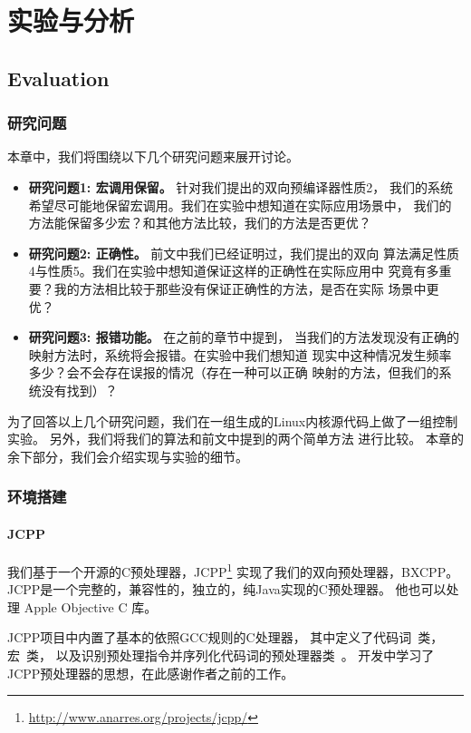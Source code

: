 \chapter{实验与分析}
\section{Evaluation}
\label{sec:evaluation}
\subsection{研究问题}
本章中，我们将围绕以下几个研究问题来展开讨论。
\begin{itemize}
\item {\bf 研究问题1: 宏调用保留。} 针对我们提出的双向预编译器性质2，
  我们的系统希望尽可能地保留宏调用。我们在实验中想知道在实际应用场景中，
  我们的方法能保留多少宏？和其他方法比较，我们的方法是否更优？
\item {\bf 研究问题2: 正确性。} 前文中我们已经证明过，我们提出的双向
  算法满足性质4与性质5。我们在实验中想知道保证这样的正确性在实际应用中
  究竟有多重要？我的方法相比较于那些没有保证正确性的方法，是否在实际
  场景中更优？
\item {\bf 研究问题3: 报错功能。}  在之前的章节中提到，
  当我们的方法发现没有正确的映射方法时，系统将会报错。在实验中我们想知道
  现实中这种情况发生频率多少？会不会存在误报的情况（存在一种可以正确
  映射的方法，但我们的系统没有找到）？
\end{itemize}

为了回答以上几个研究问题，我们在一组生成的Linux内核源代码上做了一组控制
实验。
另外，我们将我们的算法和前文中提到的两个简单方法
进行比较。
本章的余下部分，我们会介绍实现与实验的细节。

\subsection{环境搭建}

\subsubsection{JCPP}
我们基于一个开源的C预处理器，JCPP\footnote{\url{http://www.anarres.org/projects/jcpp/}}
实现了我们的双向预处理器，BXCPP。
JCPP是一个完整的，兼容性的，独立的，纯Java实现的C预处理器。
他也可以处理 Apple Objective C 库。

JCPP项目中内置了基本的依照GCC规则的C处理器，
其中定义了代码词~类，宏~类，
以及识别预处理指令并序列化代码词的预处理器类~。
开发中学习了JCPP预处理器的思想，在此感谢作者之前的工作。

